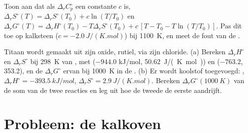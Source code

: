 \begin{exercise}[$\star\star\star$]\label{exo:b2:reaction-free-energy:11}
Toon aan dat als $\Delta_r C^\circ_p$ een constante $c$ is,
$\Delta_r S^\circ(T) = \Delta_r S^\circ(T_0) + c\ln(T/T_0)$ en
$\Delta_r G^\circ(T) = \Delta_r H^\circ(T_0) - T\Delta_r S^\circ(T_0) +
c\,[T - T_0 - T\ln(T/T_0)]$. Pas dit toe op kalksteen ($c =
\qty{-2.0}{J/(K.mol)}$) bij \qty{1100}{K}, en meet de fout van de
.
\end{exercise}

\begin{exercise}[$\star\star\star$]\label{exo:b2:reaction-free-energy:12}
Titaan wordt gemaakt uit zijn oxide, rutiel, via zijn chloride. (a) Bereken
$\Delta_r H^\circ$ en $\Delta_r S^\circ$ bij \qty{298}{K} van , met  ($-944.0$ \unit{kJ/mol},
\qty{50.62}{J/(K.mol)}) en  ($-763.2$, 353.2), en de
$\Delta_r G^\circ$ ervan bij \qty{1000}{K} in de .
(b) Er wordt koolstof toegevoegd: , $\Delta_r H^\circ =
\qty{-393.5}{kJ/mol}$, $\Delta_r S^\circ = \qty{+2.9}{J/(K.mol)}$. Bereken
$\Delta_r G^\circ(\qty{1000}{K})$ van de som van de twee reacties en
leg uit hoe de tweede de eerste aandrijft.
\end{exercise}

\section{Probleem: de kalkoven}

